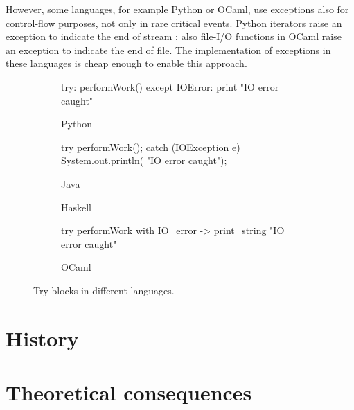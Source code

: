 However, some languages, for example Python or OCaml, use exceptions also for control-flow
purposes, not only in rare critical events. Python iterators raise an exception to
indicate the end of stream \cite{python:reference}; also file-I/O functions in OCaml raise
an exception to indicate the end of file. \cite{ocaml:reference} The implementation of
exceptions in these languages is cheap enough to enable this approach.

\begin{figure}[htp]
\centering
%
\begin{subfigure}[b]{0.46\textwidth}\begin{codepy}
try:
	performWork()
except IOError:
	print "IO error caught"
\end{codepy}\caption{Python}\end{subfigure}
%
\begin{subfigure}[b]{0.46\textwidth}\begin{codejava}
try {
	performWork();
} catch (IOException e) {
	System.out.println(
	    "IO error caught");
}
\end{codejava}\caption{Java}\end{subfigure}

\begin{subfigure}[b]{0.46\textwidth}\caption{Haskell}\end{subfigure}
%
\begin{subfigure}[b]{0.46\textwidth}\begin{codeml}
try performWork
with IO_error ->
  print_string "IO error caught"
\end{codeml}\caption{OCaml}\end{subfigure}
\caption{Try-blocks in different languages.}
\end{figure}


\section{History}

\section{Theoretical consequences}


